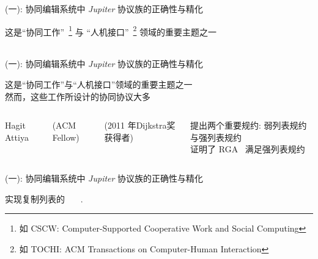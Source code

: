 
\begin{frame}{(一): 协同编辑系统中 \textsl{Jupiter} 协议族的正确性与精化}

  \begin{center}
    这是``协同工作''~\footnote{如 CSCW: Computer-Supported Cooperative Work and Social Computing} 
    与 ``人机接口''~\footnote{如 TOCHI: ACM Transactions on Computer-Human Interaction} 领域的重要主题之一 \\
    ~~~~
  \end{center}
\end{frame}

\begin{frame}{(一): 协同编辑系统中 \textsl{Jupiter} 协议族的正确性与精化}
  \begin{center}
    这是``协同工作''与``人机接口''领域的重要主题之一 \\[3pt]
    然而，这些工作所设计的协同协议大多
  \end{center}

  \begin{columns}
      \centerline{\small Hagit Attiya} 
      \centerline{\small (ACM Fellow)}
      \centerline{\small (2011 年Dijkstra奖获得者)}
      \begin{center}
	提出两个重要规约: 弱列表规约与强列表规约 \\[3pt]
	证明了 RGA~ 满足强列表规约
      \end{center}
  \end{columns}

  \pause
  \begin{center}
  \end{center}
\end{frame}

\begin{frame}{(一): 协同编辑系统中 \textsl{Jupiter} 协议族的正确性与精化}
  \begin{center}
    \begin{mdframed}[frametitle = {我们证明了如下\red{猜想@PODC'2016}~\ncite{Attiya:PODC16}}, 
	frametitlerule = true, frametitlebackgroundcolor = brown!20,
      frametitleaboveskip = 8pt, frametitlebelowskip = 8pt, innertopmargin = 10pt]
      {\large 实现复制列表的 ~~~.
      ~~} \\[8pt]
    \end{mdframed}
  \end{center}
\end{frame}

